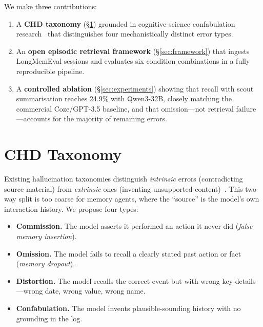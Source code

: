 \documentclass[11pt,twocolumn]{article}
\begin{document}
We make three contributions:
\begin{enumerate}[leftmargin=*,itemsep=0pt,topsep=2pt]
  \item A \textbf{CHD taxonomy} (§\ref{sec:taxonomy}) grounded in
        cognitive-science confabulation research~\cite{schnider2008confabulating}
        that distinguishes four mechanistically distinct error types.
  \item An \textbf{open episodic retrieval framework} (§\ref{sec:framework})
        that ingests LongMemEval sessions and evaluates six condition
        combinations in a fully reproducible pipeline.
  \item A \textbf{controlled ablation} (§\ref{sec:experiments}) showing
        that recall with scout summarisation reaches 24.9\% with
        Qwen3-32B, closely matching the commercial Coze/GPT-3.5 baseline,
        and that omission---not retrieval failure---accounts for
        the majority of remaining errors.
\end{enumerate}

\section{CHD Taxonomy}
\label{sec:taxonomy}

Existing hallucination taxonomies distinguish \emph{intrinsic} errors
(contradicting source material) from \emph{extrinsic} ones (inventing
unsupported content)~\cite{maynez2020faithfulness}. This two-way split
is too coarse for memory agents, where the ``source'' is the model's own
interaction history. We propose four types:

\begin{itemize}[leftmargin=*,itemsep=0pt,topsep=2pt]
  \item \textbf{Commission.} The model asserts it performed an action it
        never did (\emph{false memory insertion}).
  \item \textbf{Omission.} The model fails to recall a clearly stated past
        action or fact (\emph{memory dropout}).
  \item \textbf{Distortion.} The model recalls the correct event but with
        wrong key details---wrong date, wrong value, wrong name.
  \item \textbf{Confabulation.} The model invents plausible-sounding history
        with no grounding in the log.
\end{itemize}
\end{document}

